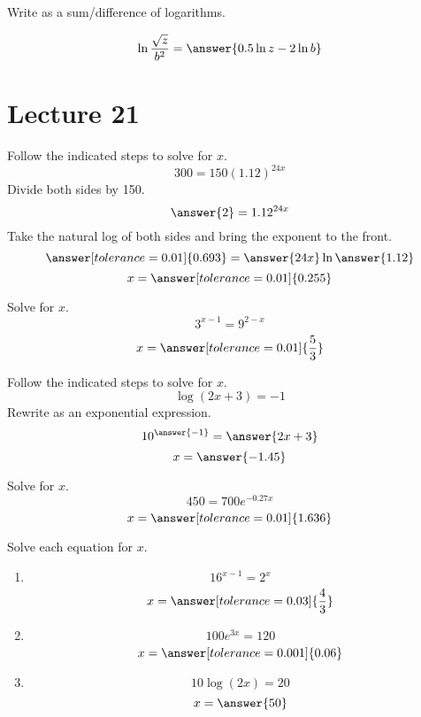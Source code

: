 \documentclass{ximera}
\begin{document}
 \begin{problem}\label{prob:160hom8prob11}
 Write as a sum/difference of logarithms.
 
 $$\ln \frac{\sqrt{z}}{b^2}=\answer{0.5\ln z-2\ln b}$$
 \end{problem}

 \section{Lecture 21}
 
 \begin{problem}\label{prob:160hom8prob4}
Follow the indicated steps to solve for $x$.
$$300=150(1.12)^{24x}$$
Divide both sides by 150.
$$\answer{2}=1.12^{24x}$$
Take the natural log of both sides and bring the exponent to the front.
$$\answer[tolerance=0.01]{0.693}=\answer{24x}\ln\answer{1.12}$$
$$x=\answer[tolerance=0.01]{0.255}$$
\end{problem}

\begin{problem}\label{prob:160hom8prob5}
Solve for $x$.
$$3^{x-1}=9^{2-x}$$
$$x=\answer[tolerance=0.01]{\frac{5}{3}}$$
\end{problem}

\begin{problem}\label{prob:160hom8prob6}
Follow the indicated steps to solve for $x$.
$$\log (2x+3)=-1$$
Rewrite as an exponential expression.
$$10^{\answer{-1}}=\answer{2x+3}$$
$$x=\answer{-1.45}$$
\end{problem}

\begin{problem}\label{prob:160hom8prob7}
Solve for $x$.
$$450=700e^{-0.27x}$$
$$x=\answer[tolerance=0.01]{1.636}$$
\end{problem}

\begin{problem}\label{prob:160hom8prob9}
 Solve each equation for $x$.
 \begin{enumerate}
     \item $$16^{x-1}=2^x$$
     $$x=\answer[tolerance=0.03]{\frac{4}{3}}$$
     \item 
     $$100e^{3x}=120$$
     $$x=\answer[tolerance=0.001]{0.06}$$
     \item 
     $$10\log (2x)=20$$
     $$x=\answer{50}$$
 \end{enumerate}
 \end{problem}
 
\end{document}
